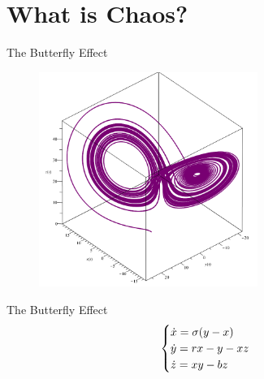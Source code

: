 \section{What is Chaos?}

    \frame{\sectionpage}
    
    \begin{frame}{The Butterfly Effect}
        \begin{figure}
            \centering
            \includegraphics[height=7cm]{lorenz2.PNG}
        \end{figure}
    \end{frame}
    
    \begin{frame}{The Butterfly Effect}
        \begin{equation*}
            \centering
            \begin{cases} 
            \dot{x} = \sigma(y-x) \\ 
            \dot{y} = rx - y - xz \\ 
            \dot{z} = xy - bz
            \end{cases}
        \end{equation*} 
    \end{frame}
    
